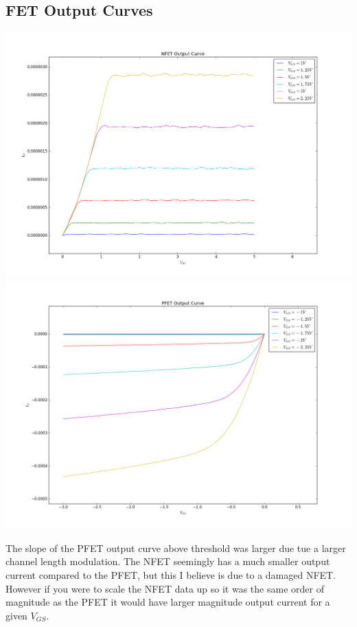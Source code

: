 \documentclass[12pt, oneside]{article}
\begin{document}
\subsection{FET Output Curves}
	\begin{center}
		\includegraphics[scale=.35]{nfet_c}\\
		\includegraphics[scale=.4]{pfet_c}\\
		\end{center}
		The slope of the PFET output curve above threshold was larger due tue a larger channel length modulation. The NFET seemingly has a much smaller output current compared to the PFET, but this I believe is due to a damaged NFET. However if you were to scale the NFET data up so it was the same order of magnitude as the PFET it would have larger magnitude output current for a given $V_{GS}$.
\end{document}
